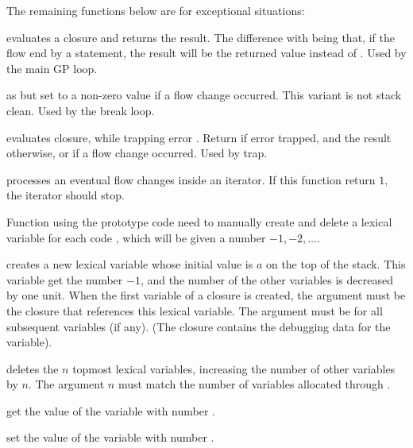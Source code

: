 The remaining functions below are for exceptional situations:

 evaluates a closure and returns the result.
The difference with  being that, if the flow end by a
 statement, the result will be the returned value instead of
. Used by the main GP loop.

 as 
but set  to a non-zero value if a flow change occurred. This
variant is not stack clean. Used by the break loop.

 evaluates closure, while
trapping error . Return  if error trapped, and the
result otherwise, or  if a flow change occurred. Used by trap.



 processes an eventual flow changes inside an
iterator. If this function return $1$, the iterator should stop.

\label{se:pushlex}

Function using the prototype code  need to manually create and delete a
lexical variable for each code , which will be given a number $-1, -2,
\ldots$.

 creates a new lexical variable whose
initial value is $a$ on the top of the stack. This variable get the number
$-1$, and the number of the other variables is decreased by one unit. When
the first variable of a closure is created, the argument  must be the
closure that references this lexical variable. The argument  must be
 for all subsequent variables (if any).  (The closure contains the
debugging data for the variable).

 deletes the $n$ topmost lexical variables,
increasing the number of other variables by $n$. The argument $n$ must match
the number of variables allocated through .

 get the value of the variable with number .

 set the value of the variable with number
.


